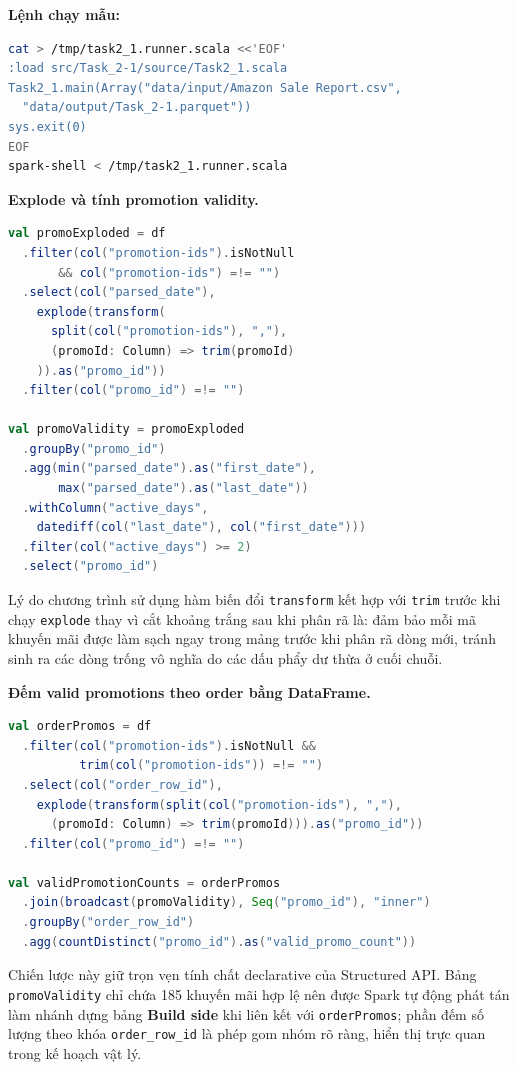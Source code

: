 \textbf{Lệnh chạy mẫu:}
\begin{lstlisting}[language=bash]
cat > /tmp/task2_1.runner.scala <<'EOF'
:load src/Task_2-1/source/Task2_1.scala
Task2_1.main(Array("data/input/Amazon Sale Report.csv",
  "data/output/Task_2-1.parquet"))
sys.exit(0)
EOF
spark-shell < /tmp/task2_1.runner.scala
\end{lstlisting}

\textbf{Explode và tính promotion validity.}
\begin{lstlisting}[language=Scala]
val promoExploded = df
  .filter(col("promotion-ids").isNotNull
       && col("promotion-ids") =!= "")
  .select(col("parsed_date"),
    explode(transform(
      split(col("promotion-ids"), ","),
      (promoId: Column) => trim(promoId)
    )).as("promo_id"))
  .filter(col("promo_id") =!= "")

val promoValidity = promoExploded
  .groupBy("promo_id")
  .agg(min("parsed_date").as("first_date"),
       max("parsed_date").as("last_date"))
  .withColumn("active_days",
    datediff(col("last_date"), col("first_date")))
  .filter(col("active_days") >= 2)
  .select("promo_id")
\end{lstlisting}

Lý do chương trình sử dụng hàm biến đổi \texttt{transform} kết hợp với \texttt{trim} trước khi chạy \texttt{explode} thay vì cắt khoảng trắng sau khi phân rã là: đảm bảo mỗi mã khuyến mãi được làm sạch ngay trong mảng trước khi phân rã dòng mới, tránh sinh ra các dòng trống vô nghĩa do các dấu phẩy dư thừa ở cuối chuỗi.

\textbf{Đếm valid promotions theo order bằng DataFrame.}
\begin{lstlisting}[language=Scala]
val orderPromos = df
  .filter(col("promotion-ids").isNotNull &&
          trim(col("promotion-ids")) =!= "")
  .select(col("order_row_id"),
    explode(transform(split(col("promotion-ids"), ","),
      (promoId: Column) => trim(promoId))).as("promo_id"))
  .filter(col("promo_id") =!= "")

val validPromotionCounts = orderPromos
  .join(broadcast(promoValidity), Seq("promo_id"), "inner")
  .groupBy("order_row_id")
  .agg(countDistinct("promo_id").as("valid_promo_count"))
\end{lstlisting}

Chiến lược này giữ trọn vẹn tính chất declarative của Structured API. Bảng \texttt{promoValidity} chỉ chứa 185 khuyến mãi hợp lệ nên được Spark tự động phát tán làm nhánh dựng bảng \textbf{Build side} khi liên kết với \texttt{orderPromos}; phần đếm số lượng theo khóa \texttt{order\_row\_id} là phép gom nhóm rõ ràng, hiển thị trực quan trong kế hoạch vật lý.

